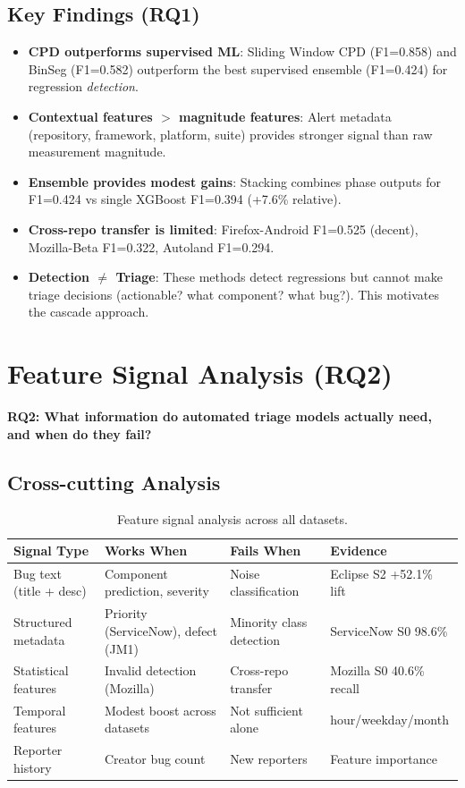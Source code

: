 \documentclass[11pt]{article}
\begin{document}
\subsection{Key Findings (RQ1)}

\begin{itemize}
    \item \textbf{CPD outperforms supervised ML}: Sliding Window CPD (F1=0.858) and BinSeg (F1=0.582) outperform the best supervised ensemble (F1=0.424) for regression \emph{detection}.
    \item \textbf{Contextual features $>$ magnitude features}: Alert metadata (repository, framework, platform, suite) provides stronger signal than raw measurement magnitude.
    \item \textbf{Ensemble provides modest gains}: Stacking combines phase outputs for F1=0.424 vs single XGBoost F1=0.394 (+7.6\% relative).
    \item \textbf{Cross-repo transfer is limited}: Firefox-Android F1=0.525 (decent), Mozilla-Beta F1=0.322, Autoland F1=0.294.
    \item \textbf{Detection $\neq$ Triage}: These methods detect regressions but cannot make triage decisions (actionable? what component? what bug?). This motivates the cascade approach.
\end{itemize}

\section{Feature Signal Analysis (RQ2)}
\label{sec:rq2}

\textbf{RQ2: What information do automated triage models actually need, and when do they fail?}

\subsection{Cross-cutting Analysis}

\begin{table}[h]
\centering
\caption{Feature signal analysis across all datasets.}
\label{tab:rq2-signals}
\begin{tabular}{p{3cm}p{3.5cm}p{3.5cm}p{3cm}}
\toprule
\textbf{Signal Type} & \textbf{Works When} & \textbf{Fails When} & \textbf{Evidence} \\
\midrule
Bug text (title + desc) & Component prediction, severity & Noise classification & Eclipse S2 +52.1\% lift \\
Structured metadata & Priority (ServiceNow), defect (JM1) & Minority class detection & ServiceNow S0 98.6\% \\
Statistical features & Invalid detection (Mozilla) & Cross-repo transfer & Mozilla S0 40.6\% recall \\
Temporal features & Modest boost across datasets & Not sufficient alone & hour/weekday/month \\
Reporter history & Creator bug count & New reporters & Feature importance \\
\bottomrule
\end{tabular}
\end{table}
\end{document}
